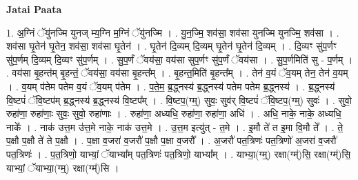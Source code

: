 \documentclass[17pt]{extarticle}
\begin{document}
\textbf{Jatai Paata} \newline

1. अ॒ग्निं ॅयु॑नज्मि युनज् म्य॒ग्नि म॒ग्निं ॅयु॑नज्मि । . यु॒न॒ज्मि॒ शव॑सा॒ शव॑सा युनज्मि युनज्मि॒ शव॑सा । . शव॑सा घृ॒तेन॑ घृ॒तेन॒ शव॑सा॒ शव॑सा घृ॒तेन॑ । . घृ॒तेन॑ दि॒व्यम् दि॒व्यम् घृ॒तेन॑ घृ॒तेन॑ दि॒व्यम् । . दि॒व्यꣳ सु॑प॒र्णꣳ सु॑प॒र्णम् दि॒व्यम् दि॒व्यꣳ सु॑प॒र्णम् । . सु॒प॒र्णं ॅवय॑सा॒ वय॑सा सुप॒र्णꣳ सु॑प॒र्णं ॅवय॑सा । . सु॒प॒र्णमिति॑ सु - प॒र्णम् । . वय॑सा बृ॒हन्त॑म् बृ॒हन्तं॒ ॅवय॑सा॒ वय॑सा बृ॒हन्त᳚म् । . बृ॒हन्त॒मिति॑ बृ॒हन्त᳚म् । . तेन॑ व॒यं ॅव॒यम् तेन॒ तेन॑ व॒यम् । . व॒यम् प॑तेम पतेम व॒यं ॅव॒यम् प॑तेम । . प॒ते॒म॒ ब्र॒द्ध्नस्य॑ ब्र॒द्ध्नस्य॑ पतेम पतेम ब्र॒द्ध्नस्य॑ । . ब्र॒द्ध्नस्य॑ वि॒ष्टपं॑ ॅवि॒ष्टप॑म् ब्र॒द्ध्नस्य॑ ब्र॒द्ध्नस्य॑ वि॒ष्टप᳚म् । . वि॒ष्टप॒(ग्म्॒) सुवः॒ सुव॑र् वि॒ष्टपं॑ ॅवि॒ष्टप॒(ग्म्॒) सुवः॑ । . सुवो॒ रुहा॑णा॒ रुहा॑णाः॒ सुवः॒ सुवो॒ रुहा॑णाः । . रुहा॑णा॒ अध्यधि॒ रुहा॑णा॒ रुहा॑णा॒ अधि॑ । . अधि॒ नाके॒ नाके॒ अध्यधि॒ नाके᳚ । . नाक॑ उत्त॒म उ॑त्त॒मे नाके॒ नाक॑ उत्त॒मे । . उ॒त्त॒म इत्यु॑त् - त॒मे । . इ॒मौ ते॑ त इ॒मा वि॒मौ ते᳚ । . ते॒ प॒क्षौ प॒क्षौ ते॑ ते प॒क्षौ । . प॒क्षा व॒जरा॑ व॒जरौ॑ प॒क्षौ प॒क्षा व॒जरौ᳚ । . अ॒जरौ॑ पत॒त्रिणः॑ पत॒त्रिणो॑ अ॒जरा॑ व॒जरौ॑ पत॒त्रिणः॑ । . प॒त॒त्रिणो॒ याभ्यां॒ ॅयाभ्या᳚म् पत॒त्रिणः॑ पत॒त्रिणो॒ याभ्या᳚म् । . याभ्या॒(ग्म्॒) रक्षा(ग्म्॑)सि॒ रक्षा(ग्म्॑)सि॒ याभ्यां॒ ॅयाभ्या॒(ग्म्॒) रक्षा(ग्म्॑)सि । \newline
\end{document}
